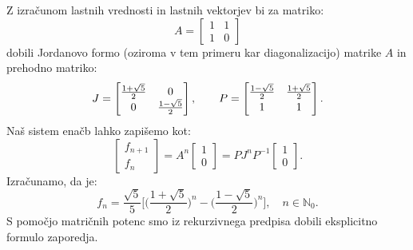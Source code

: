 \documentclass[mat1]{fmfdelo}
\begin{document}
\begin{zgled} 
    Z izračunom lastnih vrednosti in lastnih vektorjev bi za matriko:
    \begin{equation*}
        A = 
        \begin{bmatrix}
            1 & 1 \\
            1 & 0
        \end{bmatrix}
    \end{equation*}
    dobili Jordanovo formo (oziroma v tem primeru kar diagonalizacijo) matrike $A$ in prehodno matriko:
    \begin{equation*}
        J = 
        \begin{bmatrix}
                \frac{1+\sqrt{5}}{2} & 0 \\
            0 &  \frac{1-\sqrt{5}}{2}
        \end{bmatrix}
        ,\quad \quad
        P = 
        \begin{bmatrix}
            \frac{1-\sqrt{5}}{2} &  \frac{1+\sqrt{5}}{2} \vspace{2pt} \\
            1 & 1
        \end{bmatrix}.
    \end{equation*}
    Naš sistem enačb lahko zapišemo kot:
    \begin{equation*}
        \begin{bmatrix}
            f_{n+1} \\
            f_n
        \end{bmatrix}
        =
        A^n
        \begin{bmatrix}
            1 \\
            0
        \end{bmatrix}
        = PJ^n P^{-1}
        \begin{bmatrix}
            1 \\
            0
        \end{bmatrix}.
    \end{equation*}
    Izračunamo, da je:
    \begin{equation*}
        f_n = \frac{\sqrt{5}}{5}\Big[ \Big(\frac{1+\sqrt{5}}{2}\Big)^n - \Big(\frac{1-\sqrt{5}}{2}\Big)^n \Big], \quad n \in \mathbb{N}_0.
    \end{equation*}
    S pomočjo matričnih potenc smo iz rekurzivnega predpisa dobili eksplicitno formulo zaporedja.
\end{zgled}
\end{document}
